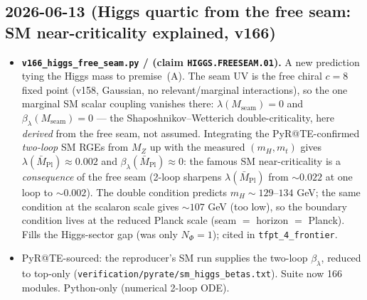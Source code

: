 \subsection*{2026-06-13 (Higgs quartic from the free seam: SM near-criticality explained, v166)}
\begin{itemize}
\item \textbf{\texttt{v166\_higgs\_free\_seam.py} \mE/\mC{} (claim \texttt{HIGGS.FREESEAM.01}).}
  A new prediction tying the Higgs mass to premise~(A). The seam UV is the free chiral
  $c{=}8$ fixed point (v158, Gaussian, no relevant/marginal interactions), so the one
  marginal SM scalar coupling vanishes there: $\lambda(M_{\mathrm{seam}})=0$ and
  $\beta_\lambda(M_{\mathrm{seam}})=0$ --- the Shaposhnikov--Wetterich double-criticality,
  here \emph{derived} from the free seam, not assumed. Integrating the PyR@TE-confirmed
  \emph{two-loop} SM RGEs from $M_Z$ up with the measured $(m_H,m_t)$ gives
  $\lambda(\bar M_{\mathrm{Pl}})\approx0.002$ and $\beta_\lambda(\bar M_{\mathrm{Pl}})\approx0$:
  the famous SM near-criticality is a \emph{consequence} of the free seam (2-loop sharpens
  $\lambda(\bar M_{\mathrm{Pl}})$ from ${\sim}0.022$ at one loop to ${\sim}0.002$). The double
  condition predicts $m_H\sim129$--$134$ GeV; the same condition at the scalaron scale gives
  ${\sim}107$ GeV (too low), so the boundary condition lives at the reduced Planck scale
  (seam $=$ horizon $=$ Planck). Fills the Higgs-sector gap (was only $N_\Phi=1$); cited in
  \texttt{tfpt\_4\_frontier}.
\item PyR@TE-sourced: the reproducer's SM run supplies the two-loop $\beta_\lambda$, reduced
  to top-only (\texttt{verification/pyrate/sm\_higgs\_betas.txt}). Suite now 166 modules.
  Python-only (numerical 2-loop ODE).
\end{itemize}

